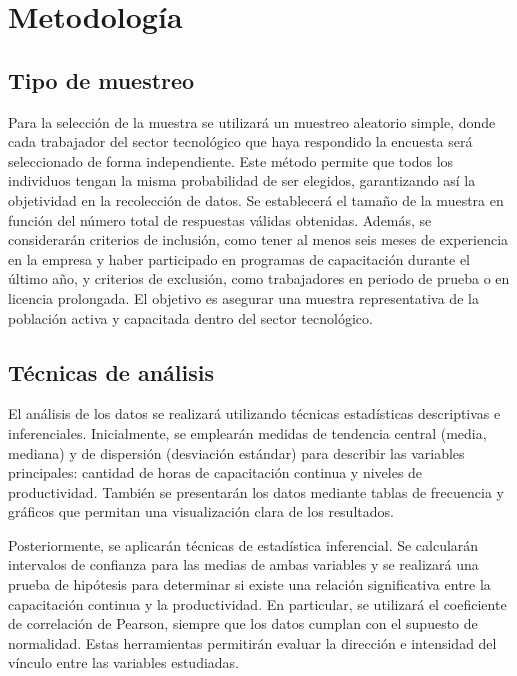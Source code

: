 \section{Metodología}

	\subsection{Tipo de muestreo}
	
	Para la selección de la muestra se utilizará un muestreo aleatorio simple, donde cada trabajador del sector tecnológico que haya respondido la encuesta será seleccionado de forma independiente. Este método permite que todos los individuos tengan la misma probabilidad de ser elegidos, garantizando así la objetividad en la recolección de datos. Se establecerá el tamaño de la muestra en función del número total de respuestas válidas obtenidas. Además, se considerarán criterios de inclusión, como tener al menos seis meses de experiencia en la empresa y haber participado en programas de capacitación durante el último año, y criterios de exclusión, como trabajadores en periodo de prueba o en licencia prolongada. El objetivo es asegurar una muestra representativa de la población activa y capacitada dentro del sector tecnológico.
	
	\subsection{Técnicas de análisis}
	
	El análisis de los datos se realizará utilizando técnicas estadísticas descriptivas e inferenciales. Inicialmente, se emplearán medidas de tendencia central (media, mediana) y de dispersión (desviación estándar) para describir las variables principales: cantidad de horas de capacitación continua y niveles de productividad. También se presentarán los datos mediante tablas de frecuencia y gráficos que permitan una visualización clara de los resultados.
	
	Posteriormente, se aplicarán técnicas de estadística inferencial. Se calcularán intervalos de confianza para las medias de ambas variables y se realizará una prueba de hipótesis para determinar si existe una relación significativa entre la capacitación continua y la productividad. En particular, se utilizará el coeficiente de correlación de Pearson, siempre que los datos cumplan con el supuesto de normalidad. Estas herramientas permitirán evaluar la dirección e intensidad del vínculo entre las variables estudiadas.
	
